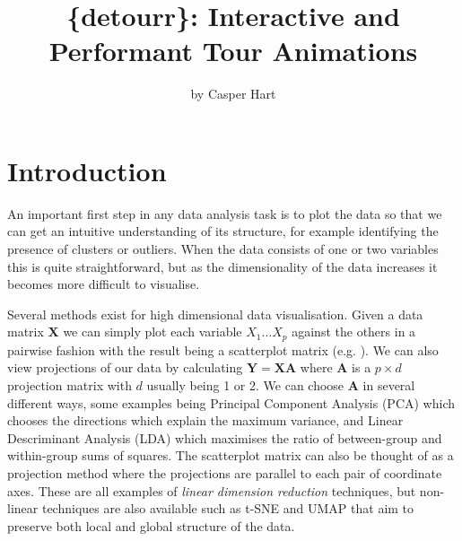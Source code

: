 \title{\{detourr\}: Interactive and Performant Tour Animations}
\author{by Casper Hart}

\maketitle


\hypertarget{ch:intro}{%
\section{Introduction}\label{ch:intro}}

An important first step in any data analysis task is to plot the data so
that we can get an intuitive understanding of its structure, for example
identifying the presence of clusters or outliers. When the data consists
of one or two variables this is quite straightforward, but as the
dimensionality of the data increases it becomes more difficult to
visualise.

Several methods exist for high dimensional data visualisation. Given a
data matrix \(\mathbf X\) we can simply plot each variable
\(X_1 \dots X_p\) against the others in a pairwise fashion with the
result being a scatterplot matrix (e.g. \citep{becker1987brushing}). We
can also view projections of our data by calculating
\(\mathbf Y = \mathbf X \mathbf A\) where \(\mathbf A\) is a
\(p \times d\) projection matrix with \(d\) usually being 1 or 2. We can
choose \(\mathbf A\) in several different ways, some examples being
Principal Component Analysis (PCA) which chooses the directions which
explain the maximum variance, and Linear Descriminant Analysis (LDA)
which maximises the ratio of between-group and within-group sums of
squares. The scatterplot matrix can also be thought of as a projection
method where the projections are parallel to each pair of coordinate
axes. These are all examples of \emph{linear dimension reduction}
techniques, but non-linear techniques are also available such as t-SNE
\citep{van2008tsne} and UMAP \citep{mcinnes2018umap} that aim to
preserve both local and global structure of the data.

